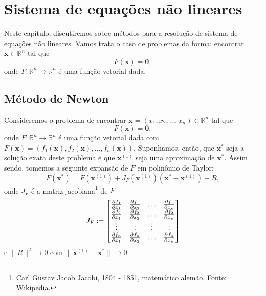 
\chapter{Sistema de equações não lineares}\label{cap_snl}
\thispagestyle{fancy}

Neste capítulo, discutiremos sobre métodos para a resolução de sistema de equações não lineares. Vamos trata o caso de problemas da forma: encontrar $\pmb{x}\in\mathbb{R}^n$ tal que
\begin{equation}
  F(\pmb{x}) = \pmb{0},
\end{equation}
onde $F:\mathbb{R}^n\to\mathbb{R}^n$ é uma função vetorial dada.

\section{Método de Newton}\label{cap_snl_sec_newton}

Consideremos o problema de encontrar $\pmb{x} = (x_1, x_2, \dotsc, x_n)\in\mathbb{R}^n$ tal que
\begin{equation}
  F(\pmb{x}) = \pmb{0},
\end{equation}
onde $F:\mathbb{R}^n\to\mathbb{R}^n$ é uma função vetorial dada com $F(\pmb{x}) = (f_1(\pmb{x}), f_2(\pmb{x}), \dotsc, f_n(\pmb{x}))$. Suponhamos, então, que $\pmb{x}^*$ seja a solução exata deste problema e que $\pmb{x}^{(1)}$ seja uma aproximação de $\pmb{x}^*$. Assim sendo, tomemos a seguinte expansão de $F$ em polinômio de Taylor:
\begin{equation}
  F(\pmb{x}^*) = F(\pmb{x}^{(1)}) + J_F(\pmb{x}^{(1)})(\pmb{x}^*-\pmb{x}^{(1)}) + R,
\end{equation}
onde $J_F$ é a matriz jacobiana\footnote{Carl Gustav Jacob Jacobi, 1804 - 1851, matemático alemão. Fonte: \href{https://en.wikipedia.org/wiki/Carl_Gustav_Jacob_Jacobi}{Wikipedia}.} de $F$
\begin{equation}
  J_F :=
  \begin{bmatrix}
    \frac{\partial f_1}{\partial x_1} & \frac{\partial f_1}{\partial x_2} & \ldots & \frac{\partial f_1}{\partial x_n}\\
    \frac{\partial f_2}{\partial x_1} & \frac{\partial f_2}{\partial x_2} & \ldots & \frac{\partial f_2}{\partial x_n}\\
    \vdots & \vdots & \vdots & \vdots \\
    \frac{\partial f_n}{\partial x_1} & \frac{\partial f_n}{\partial x_2} & \ldots & \frac{\partial f_n}{\partial x_n}\\
  \end{bmatrix}
\end{equation}
e $\|R\|^2\to 0$ com $\|\pmb{x}^{(1)}-\pmb{x}^*\|\to 0$. 

